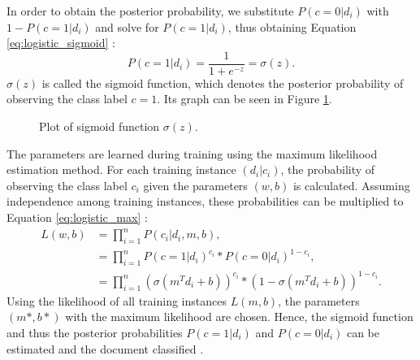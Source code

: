 In order to obtain the posterior probability, we substitute $P(c=0|d_i)$ with $1 - P(c=1|d_i)$ and solve for $P(c=1|d_i)$, thus obtaining Equation \eqref{eq:logistic_sigmoid} \cite{DBLP:books/aw/TanSKK2019}:
        {\begin{equation}
            \label{eq:logistic_sigmoid}
                P(c=1|d_i) = \frac{1}{1+e^{-z}} = \sigma(z).
        \end{equation}}
$\sigma(z)$ is called the sigmoid function, which denotes the posterior probability of observing the class label $c=1$. Its graph can be seen in Figure \ref{fig:sigmoid}.
        \begin{figure}
        \centering

    \caption{Plot of sigmoid function $\sigma(z)$.}
      \label{fig:sigmoid}
\end{figure}
The parameters are learned during training using the maximum likelihood estimation method. For each training instance $(d_i|c_i)$, the probability of observing the class label $c_i$ given the parameters $(w,b)$ is calculated. Assuming independence among training instances, these probabilities can be multiplied to Equation \eqref{eq:logistic_max} \cite{DBLP:books/aw/TanSKK2019}:
        \begin{equation}
        \begin{split}
            \label{eq:logistic_max}
                L(w,b) & = \prod_{i=1}^{n}P(c_i|d_i,m,b), \\
                        & = \prod_{i=1}^{n}P(c=1|d_i)^{c_i} * P(c=0|d_i)^{1-c_i}, \\
                    &    = \prod_{i=1}^{n}(\sigma(m^T d_i + b))^{c_i} * (1 - \sigma(m^T d_i + b))^{1-c_i}.
                        \end{split}
        \end{equation}
Using the likelihood of all training instances $L(m,b)$, the parameters $(m*,b*)$ with the maximum likelihood are chosen. Hence, the sigmoid function and thus the posterior probabilities $P(c=1|d_i)$ and $P(c=0|d_i)$ can be estimated and the document classified \cite{DBLP:books/aw/TanSKK2019}.



